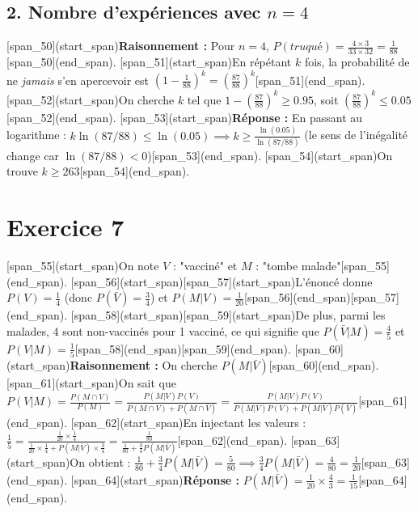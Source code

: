 \documentclass[11pt,a4paper]{article}
\begin{document}
\subsection*{2. Nombre d'expériences avec $n=4$}
[span_50](start_span)\textbf{Raisonnement :} Pour $n=4$, $P(truqué) = \frac{4 \times 3}{33 \times 32} = \frac{1}{88}$[span_50](end_span).
[span_51](start_span)En répétant $k$ fois, la probabilité de ne \textit{jamais} s'en apercevoir est $(1 - \frac{1}{88})^k = (\frac{87}{88})^k$[span_51](end_span).
[span_52](start_span)On cherche $k$ tel que $1 - (\frac{87}{88})^k \ge 0.95$, soit $(\frac{87}{88})^k \le 0.05$[span_52](end_span).
[span_53](start_span)\textbf{Réponse :} En passant au logarithme : $k \ln(87/88) \le \ln(0.05) \implies k \ge \frac{\ln(0.05)}{\ln(87/88)}$ (le sens de l'inégalité change car $\ln(87/88) < 0$)[span_53](end_span). [span_54](start_span)On trouve $k \ge 263$[span_54](end_span).

\hrulefill

\section*{Exercice 7}
[span_55](start_span)On note $V$ : "vacciné" et $M$ : "tombe malade"[span_55](end_span).
[span_56](start_span)[span_57](start_span)L'énoncé donne $P(V) = \frac{1}{4}$ (donc $P(\bar{V}) = \frac{3}{4}$) et $P(M|V) = \frac{1}{20}$[span_56](end_span)[span_57](end_span). 
[span_58](start_span)[span_59](start_span)De plus, parmi les malades, 4 sont non-vaccinés pour 1 vacciné, ce qui signifie que $P(\bar{V}|M) = \frac{4}{5}$ et $P(V|M) = \frac{1}{5}$[span_58](end_span)[span_59](end_span).
[span_60](start_span)\textbf{Raisonnement :} On cherche $P(M|\bar{V})$[span_60](end_span).
[span_61](start_span)On sait que $P(V|M) = \frac{P(M \cap V)}{P(M)} = \frac{P(M|V)P(V)}{P(M \cap V) + P(M \cap \bar{V})} = \frac{P(M|V)P(V)}{P(M|V)P(V) + P(M|\bar{V})P(\bar{V})}$[span_61](end_span).
[span_62](start_span)En injectant les valeurs : $\frac{1}{5} = \frac{\frac{1}{20} \times \frac{1}{4}}{\frac{1}{20} \times \frac{1}{4} + P(M|\bar{V}) \times \frac{3}{4}} = \frac{\frac{1}{80}}{\frac{1}{80} + \frac{3}{4}P(M|\bar{V})}$[span_62](end_span).
[span_63](start_span)On obtient : $\frac{1}{80} + \frac{3}{4}P(M|\bar{V}) = \frac{5}{80} \implies \frac{3}{4}P(M|\bar{V}) = \frac{4}{80} = \frac{1}{20}$[span_63](end_span).
[span_64](start_span)\textbf{Réponse :} $P(M|\bar{V}) = \frac{1}{20} \times \frac{4}{3} = \frac{1}{15}$[span_64](end_span).

\hrulefill
\end{document}
